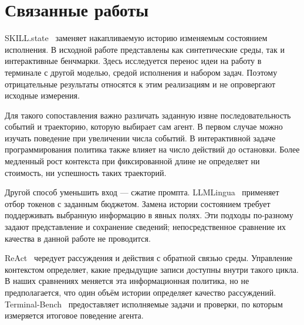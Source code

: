 \section{Связанные работы}
\label{sec:related}
SKILL.state~\citep{skillstate2026} заменяет накапливаемую историю изменяемым состоянием исполнения. В исходной работе представлены как синтетические среды, так и интерактивные бенчмарки. Здесь исследуется перенос идеи на работу в терминале с другой моделью, средой исполнения и набором задач. Поэтому отрицательные результаты относятся к этим реализациям и не опровергают исходные измерения.

Для такого сопоставления важно различать заданную извне последовательность событий и траекторию, которую выбирает сам агент. В первом случае можно изучать поведение при увеличении числа событий. В интерактивной задаче программирования политика также влияет на число действий до остановки. Более медленный рост контекста при фиксированной длине не определяет ни стоимость, ни успешность таких траекторий.

Другой способ уменьшить вход --- сжатие промпта. LLMLingua~\citep{llmlingua2023} применяет отбор токенов с заданным бюджетом. Замена истории состоянием требует поддерживать выбранную информацию в явных полях. Эти подходы по-разному задают представление и сохранение сведений; непосредственное сравнение их качества в данной работе не проводится.

ReAct~\citep{react2022} чередует рассуждения и действия с обратной связью среды. Управление контекстом определяет, какие предыдущие записи доступны внутри такого цикла. В наших сравнениях меняется эта информационная политика, но не предполагается, что один объём истории определяет качество рассуждений. Terminal-Bench~\citep{terminalbench} предоставляет исполняемые задачи и проверки, по которым измеряется итоговое поведение агента.
